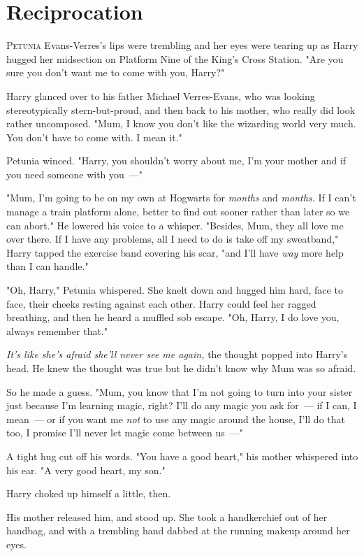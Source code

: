 \chapter{Reciprocation}

\lettrine{P}{etunia} Evans-Verres's lips were trembling and her eyes were tearing up as
Harry hugged her midsection on Platform Nine of the King's Cross Station. "Are
you sure you don't want me to come with you, Harry?"

Harry glanced over to his father Michael Verres-Evans, who was looking
stereotypically stern-but-proud, and then back to his mother, who really did
look rather{\el} uncomposed. "Mum, I know you don't like the wizarding world
very much. You don't have to come with. I mean it."

Petunia winced. "Harry, you shouldn't worry about me, I'm your mother and if
you need someone with you~---"

"Mum, I'm going to be on my own at Hogwarts for \emph{months} and
\emph{months.} If I can't manage a train platform alone, better to find out
sooner rather than later so we can abort." He lowered his voice to a whisper.
"Besides, Mum, they all love me over there. If I have any problems, all I need
to do is take off my sweatband," Harry tapped the exercise band covering his
scar, "and I'll have \emph{way} more help than I can handle."

"Oh, Harry," Petunia whispered. She knelt down and hugged him hard, face to
face, their cheeks resting against each other. Harry could feel her ragged
breathing, and then he heard a muffled sob escape. "Oh, Harry, I do love you,
always remember that."

\emph{It's like she's afraid she'll never see me again,} the thought popped
into Harry's head. He knew the thought was true but he didn't know why Mum was
so afraid.

So he made a guess. "Mum, you know that I'm not going to turn into your sister
just because I'm learning magic, right? I'll do any magic you ask for~--- if I
can, I mean~--- or if you want me \emph{not} to use any magic around the house,
I'll do that too, I promise I'll never let magic come between us~---"

A tight hug cut off his words. "You have a good heart," his mother whispered
into his ear. "A very good heart, my son."

Harry choked up himself a little, then.

His mother released him, and stood up. She took a handkerchief out of her
handbag, and with a trembling hand dabbed at the running makeup around her eyes.

